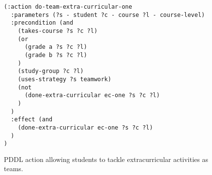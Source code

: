 \begin{figure}[t]
\begin{lstlisting}
(:action do-team-extra-curricular-one
  :parameters (?s - student ?c - course ?l - course-level)
  :precondition (and 
    (takes-course ?s ?c ?l)
    (or
      (grade a ?s ?c ?l)
      (grade b ?s ?c ?l)
    )
    (study-group ?c ?l)
    (uses-strategy ?s teamwork)
    (not
      (done-extra-curricular ec-one ?s ?c ?l)
    )
  )
  :effect (and 
    (done-extra-curricular ec-one ?s ?c ?l)
  )
)
\end{lstlisting}
\caption{PDDL action allowing students to tackle extracurricular activities as teams.}\label{fig:team-extra-curricular-one}
\end{figure}